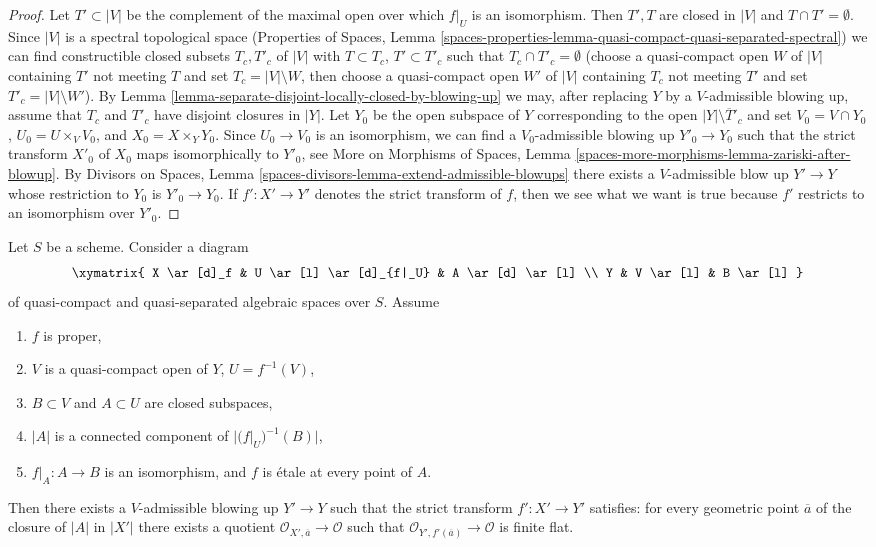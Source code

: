 \begin{proof}
Let $T' \subset |V|$ be the complement of the maximal open over which
$f|_U$ is an isomorphism. Then $T', T$ are closed in $|V|$ and
$T \cap T' = \emptyset$. Since $|V|$ is a spectral topological space
(Properties of Spaces, Lemma
\ref{spaces-properties-lemma-quasi-compact-quasi-separated-spectral})
we can find constructible closed subsets $T_c, T'_c$ of $|V|$
with $T \subset T_c$, $T' \subset T'_c$ such that
$T_c \cap T'_c = \emptyset$ (choose a quasi-compact
open $W$ of $|V|$ containing $T'$ not meeting $T$
and set $T_c = |V| \setminus W$, then choose a quasi-compact
open $W'$ of $|V|$ containing $T_c$ not meeting $T'$
and set $T'_c = |V| \setminus W'$).
By Lemma \ref{lemma-separate-disjoint-locally-closed-by-blowing-up}
we may, after replacing $Y$ by a $V$-admissible blowing up,
assume that $T_c$ and $T'_c$ have disjoint closures in $|Y|$.
Let $Y_0$ be the open subspace of $Y$ corresponding to the open
$|Y| \setminus \overline{T}'_c$ and set $V_0 = V \cap Y_0$,
$U_0 = U \times_V V_0$, and $X_0 = X \times_Y Y_0$.
Since $U_0 \to V_0$ is an isomorphism, we can find a
$V_0$-admissible blowing up $Y'_0 \to Y_0$ such that the
strict transform $X'_0$ of $X_0$ maps isomorphically to $Y'_0$, see
More on Morphisms of Spaces, Lemma
\ref{spaces-more-morphisms-lemma-zariski-after-blowup}.
By Divisors on Spaces, Lemma
\ref{spaces-divisors-lemma-extend-admissible-blowups}
there exists a $V$-admissible blow up $Y' \to Y$ whose restriction
to $Y_0$ is $Y'_0 \to Y_0$. If $f' : X' \to Y'$ denotes the
strict transform of $f$, then we see what we want is true because
$f'$ restricts to an isomorphism over $Y'_0$.
\end{proof}

\begin{lemma}
\label{lemma-blowup-etale-along}
Let $S$ be a scheme. Consider a diagram
$$
\xymatrix{
X \ar[d]_f & U \ar[l] \ar[d]_{f|_U} & A \ar[d] \ar[l] \\
Y & V \ar[l] & B \ar[l]
}
$$
of quasi-compact and quasi-separated algebraic spaces over $S$.
Assume
\begin{enumerate}
\item $f$ is proper,
\item $V$ is a quasi-compact open of $Y$, $U = f^{-1}(V)$,
\item $B \subset V$ and $A \subset U$ are closed subspaces,
\item $|A|$ is a connected component of $|(f|_U)^{-1}(B)|$,
\item $f|_A : A \to B$ is an isomorphism, and
$f$ is \'etale at every point of $A$.
\end{enumerate}
Then there exists a $V$-admissible blowing up $Y' \to Y$ such that the strict
transform $f' : X' \to Y'$ satisfies: for every geometric point
$\overline{a}$ of the closure of $|A|$ in $|X'|$
there exists a quotient $\mathcal{O}_{X', \overline{a}} \to \mathcal{O}$
such that $\mathcal{O}_{Y', f'(\overline{a})} \to \mathcal{O}$
is finite flat.
\end{lemma}

